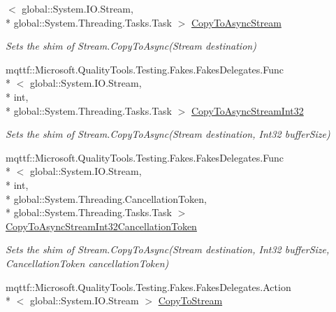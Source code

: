 \begin{DoxyCompactItemize}
$<$ global\-::\-System.\-I\-O.\-Stream, \\*
global\-::\-System.\-Threading.\-Tasks.\-Task $>$ \hyperlink{class_system_1_1_i_o_1_1_fakes_1_1_shim_stream_ac5bce375e21ec05be75d7b58faf70288}{Copy\-To\-Async\-Stream}
\begin{DoxyCompactList}\small\item\em Sets the shim of Stream.\-Copy\-To\-Async(\-Stream destination)\end{DoxyCompactList}\item 
mqttf\-::\-Microsoft.\-Quality\-Tools.\-Testing.\-Fakes.\-Fakes\-Delegates.\-Func\\*
$<$ global\-::\-System.\-I\-O.\-Stream, \\*
int, \\*
global\-::\-System.\-Threading.\-Tasks.\-Task $>$ \hyperlink{class_system_1_1_i_o_1_1_fakes_1_1_shim_stream_a10b2e03bff692b190b7ee73138e2e1c2}{Copy\-To\-Async\-Stream\-Int32}
\begin{DoxyCompactList}\small\item\em Sets the shim of Stream.\-Copy\-To\-Async(\-Stream destination, Int32 buffer\-Size)\end{DoxyCompactList}\item 
mqttf\-::\-Microsoft.\-Quality\-Tools.\-Testing.\-Fakes.\-Fakes\-Delegates.\-Func\\*
$<$ global\-::\-System.\-I\-O.\-Stream, \\*
int, \\*
global\-::\-System.\-Threading.\-Cancellation\-Token, \\*
global\-::\-System.\-Threading.\-Tasks.\-Task $>$ \hyperlink{class_system_1_1_i_o_1_1_fakes_1_1_shim_stream_a3df7540f23f5050167e964f0678028ab}{Copy\-To\-Async\-Stream\-Int32\-Cancellation\-Token}
\begin{DoxyCompactList}\small\item\em Sets the shim of Stream.\-Copy\-To\-Async(\-Stream destination, Int32 buffer\-Size, Cancellation\-Token cancellation\-Token)\end{DoxyCompactList}\item 
mqttf\-::\-Microsoft.\-Quality\-Tools.\-Testing.\-Fakes.\-Fakes\-Delegates.\-Action\\*
$<$ global\-::\-System.\-I\-O.\-Stream $>$ \hyperlink{class_system_1_1_i_o_1_1_fakes_1_1_shim_stream_af9feb0782e81e1e5543df1092a8c0493}{Copy\-To\-Stream}

\end{DoxyCompactItemize}
